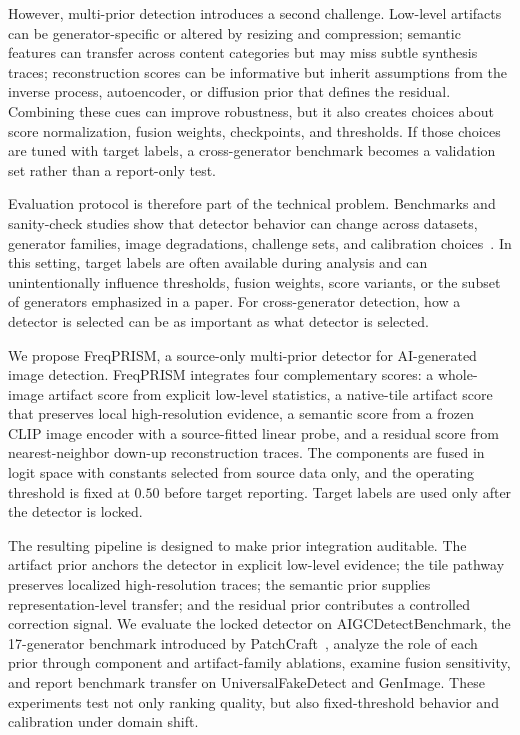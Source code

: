 \documentclass[lettersize,journal]{IEEEtran}
\begin{document}
However, multi-prior detection introduces a second challenge. Low-level artifacts can be generator-specific or altered by resizing and compression; semantic features can transfer across content categories but may miss subtle synthesis traces; reconstruction scores can be informative but inherit assumptions from the inverse process, autoencoder, or diffusion prior that defines the residual. Combining these cues can improve robustness, but it also creates choices about score normalization, fusion weights, checkpoints, and thresholds. If those choices are tuned with target labels, a cross-generator benchmark becomes a validation set rather than a report-only test.

Evaluation protocol is therefore part of the technical problem. Benchmarks and sanity-check studies show that detector behavior can change across datasets, generator families, image degradations, challenge sets, and calibration choices~\cite{yan2023deepfakebench,zhu2023genimage,yan2025aide,li2025rrdataset,yang2026calibrated}. In this setting, target labels are often available during analysis and can unintentionally influence thresholds, fusion weights, score variants, or the subset of generators emphasized in a paper. For cross-generator detection, how a detector is selected can be as important as what detector is selected.

We propose FreqPRISM, a source-only multi-prior detector for AI-generated image detection. FreqPRISM integrates four complementary scores: a whole-image artifact score from explicit low-level statistics, a native-tile artifact score that preserves local high-resolution evidence, a semantic score from a frozen CLIP image encoder with a source-fitted linear probe, and a residual score from nearest-neighbor down-up reconstruction traces. The components are fused in logit space with constants selected from source data only, and the operating threshold is fixed at $0.50$ before target reporting. Target labels are used only after the detector is locked.

The resulting pipeline is designed to make prior integration auditable. The artifact prior anchors the detector in explicit low-level evidence; the tile pathway preserves localized high-resolution traces; the semantic prior supplies representation-level transfer; and the residual prior contributes a controlled correction signal. We evaluate the locked detector on AIGCDetectBenchmark, the 17-generator benchmark introduced by PatchCraft~\cite{zhong2023patchcraft}, analyze the role of each prior through component and artifact-family ablations, examine fusion sensitivity, and report benchmark transfer on UniversalFakeDetect and GenImage. These experiments test not only ranking quality, but also fixed-threshold behavior and calibration under domain shift.
\end{document}
